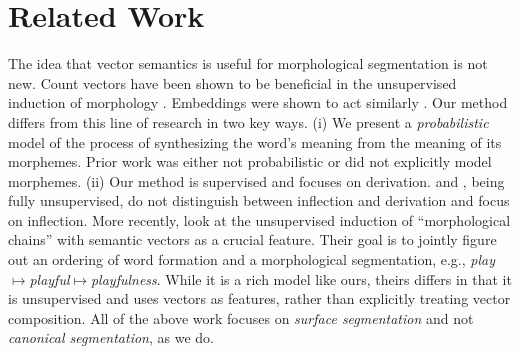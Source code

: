 \documentclass[11pt,letterpaper]{article}
\newcommand{\word}[1]{{\em #1}}
\begin{document}
\begin{table*}
\begin{tabular}{ll||lll|lll}
  \end{tabular}
  \caption{Results for the canonical morphological segmentation task on English and German. Standard deviation is given in parentheses. We compare against two baselines that do not
    make use of semantic vectors: (i) ``Semi-CRF
    (baseline)'', a semi-CRF
    that {\em cannot} account for orthographic changes and
    (ii) ``Joint (Baseline)'', a version of our joint model without vectors. We also
    compare against an oracle version with
    access to  gold URs (``Joint + UR (Oracle)'', ``Joint +
    UR + Vec (Oracle)''), revealing that the toughest
    part of the canonical segmentation task is reversing the orthographic changes.}
\end{table*}
 

\section{Related Work}

%
%
%


The idea that vector semantics is useful for morphological segmentation is not
new. Count vectors \cite{salton71smart,turney2010frequency} 
have been shown to be
beneficial in the unsupervised induction of morphology
\cite{schone2000knowledge,schone2001knowledge}. 
Embeddings
were shown to act similarly
\cite{soricut2015unsupervised}. Our method differs from this
line of research in
two key ways. (i) We present a \emph{probabilistic} model of the process of
synthesizing the word's meaning from the meaning of its
 morphemes. Prior work was either not probabilistic or did
 not explicitly model morphemes.
(ii) Our method is supervised and focuses on
derivation.   and
, being fully unsupervised, do not
distinguish between inflection and derivation and  focus on inflection.
More recently,  look
at the unsupervised induction of ``morphological chains'' with
semantic vectors as a crucial feature. Their goal is to jointly
figure out an ordering of word formation and a morphological segmentation, e.g.,
\word{play}$\mapsto$\word{playful}$\mapsto$\word{playfulness}.
While it is a rich model like ours, theirs
differs in that it is unsupervised
and uses vectors as features, rather than explicitly treating
vector composition. All of the above work focuses
on {\em surface segmentation} and not {\em canonical segmentation}, as we do.
\end{document}
